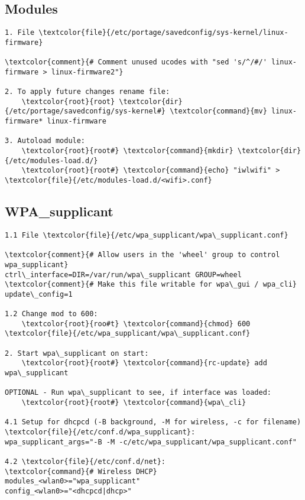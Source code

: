 \documentclass[10pt, a4paper, onecolumn, openany]{book}         %
\begin{document}
\subsection{Modules}
\begin{Verbatim}[commandchars=\\\{\}]
1. File \textcolor{file}{/etc/portage/savedconfig/sys-kernel/linux-firmware}

\textcolor{comment}{# Comment unused ucodes with "sed 's/^/#/' linux-firmware > linux-firmware2"}

2. To apply future changes rename file:
    \textcolor{root}{root} \textcolor{dir}{/etc/portage/savedconfig/sys-kernel#} \textcolor{command}{mv} linux-firmware* linux-firmware 
    
3. Autoload module:
    \textcolor{root}{root#} \textcolor{command}{mkdir} \textcolor{dir}{/etc/modules-load.d/}
    \textcolor{root}{root#} \textcolor{command}{echo} "iwlwifi" > \textcolor{file}{/etc/modules-load.d/<wifi>.conf}
\end{Verbatim}

\subsection{WPA\_supplicant}
\begin{Verbatim}[commandchars=\\\{\}]
1.1 File \textcolor{file}{/etc/wpa_supplicant/wpa\_supplicant.conf}

\textcolor{comment}{# Allow users in the 'wheel' group to control wpa_supplicant}
ctrl\_interface=DIR=/var/run/wpa\_supplicant GROUP=wheel
\textcolor{comment}{# Make this file writable for wpa\_gui / wpa_cli}
update\_config=1

1.2 Change mod to 600:
    \textcolor{root}{roo#t} \textcolor{command}{chmod} 600 \textcolor{file}{/etc/wpa_supplicant/wpa\_supplicant.conf}

2. Start wpa\_supplicant on start:
    \textcolor{root}{root#} \textcolor{command}{rc-update} add wpa\_supplicant
    
OPTIONAL - Run wpa\_supplicant to see, if interface was loaded:
    \textcolor{root}{root#} \textcolor{command}{wpa\_cli}
    
4.1 Setup for dhcpcd (-B background, -M for wireless, -c for filename)
\textcolor{file}{/etc/conf.d/wpa_supplicant}:
wpa_supplicant_args="-B -M -c/etc/wpa_supplicant/wpa_supplicant.conf"

4.2 \textcolor{file}{/etc/conf.d/net}:
\textcolor{command}{# Wireless DHCP}
modules_<wlan0>="wpa_supplicant"
config_<wlan0>="<dhcpcd|dhcp>"
\end{Verbatim}
\end{document}
